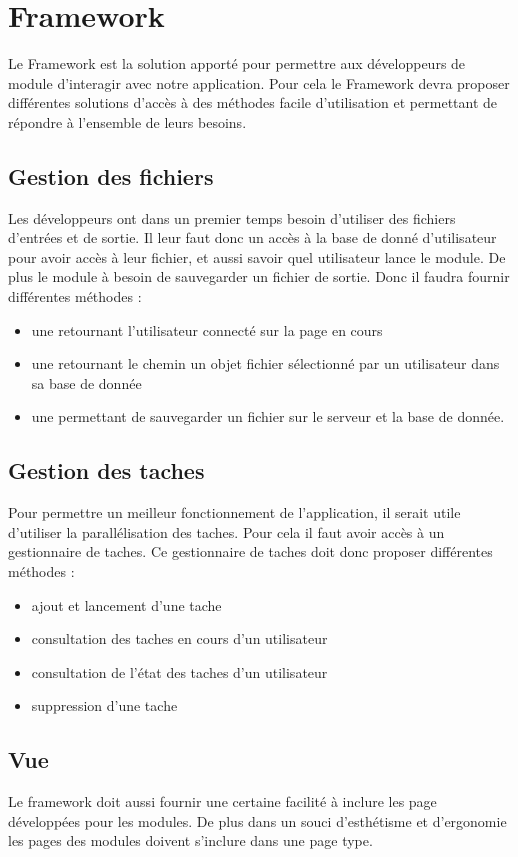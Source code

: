 \section{Framework}

Le Framework est la solution apporté pour permettre aux développeurs de module d'interagir avec notre application. Pour cela le Framework devra proposer différentes solutions d'accès à des méthodes facile d'utilisation et permettant de répondre à l'ensemble de leurs besoins. \\


\subsection{Gestion des fichiers}

Les développeurs ont dans un premier temps besoin d'utiliser des fichiers d'entrées et de sortie. Il leur faut donc un accès à la base de donné d'utilisateur pour avoir accès à leur fichier, et aussi savoir quel utilisateur lance le module. De plus le module à besoin de sauvegarder un fichier de sortie. Donc il faudra fournir différentes méthodes :\\
\begin{itemize}
\item une retournant l'utilisateur connecté sur la page en cours
\item une retournant le chemin un objet fichier sélectionné par un utilisateur dans sa base de donnée
\item une permettant de sauvegarder un fichier sur le serveur et la base de donnée.
\end{itemize}

\subsection{Gestion des taches}

Pour permettre un meilleur fonctionnement de l'application, il serait utile d'utiliser la parallélisation des taches. Pour cela il faut avoir accès à un gestionnaire de taches. Ce gestionnaire de taches doit donc proposer différentes méthodes : \\
\begin{itemize}
\item ajout et lancement d'une tache
\item consultation des taches en cours d'un utilisateur
\item consultation de l'état des taches d'un utilisateur
\item suppression d'une tache
\end{itemize}


\subsection{Vue}

Le framework doit aussi fournir une certaine facilité à inclure les page développées pour les modules. De plus dans un souci d'esthétisme et d'ergonomie les pages des modules doivent s'inclure dans une page type.